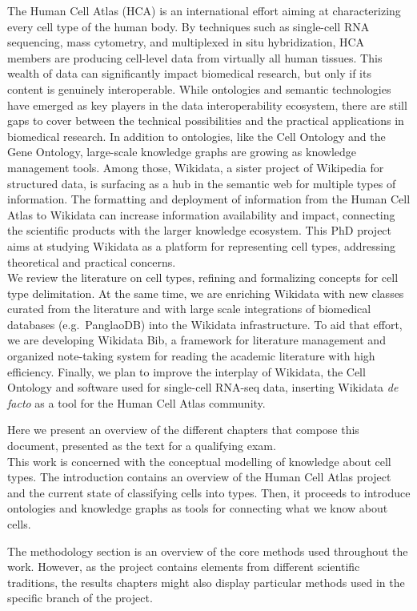 The Human Cell Atlas (HCA) is an international effort aiming at characterizing every cell type of the human body.
By techniques such as single-cell RNA sequencing, mass cytometry, and multiplexed in situ hybridization, HCA members are producing cell-level data from virtually all human tissues.
This wealth of data can significantly impact biomedical research, but only if its content is genuinely interoperable.
While ontologies and semantic technologies have emerged as key players in the data interoperability ecosystem, there are still gaps to cover between the technical possibilities and the practical applications in biomedical research.
In addition to ontologies, like the Cell Ontology and the Gene Ontology, large-scale knowledge graphs are growing as knowledge management tools.
Among those, Wikidata, a sister project of Wikipedia for structured data, is surfacing as a hub in the semantic web for multiple types of information.
The formatting and deployment of information from the Human Cell Atlas to Wikidata can increase information availability and impact, connecting the scientific products with the larger knowledge ecosystem.
This PhD project aims at studying Wikidata as a platform for representing cell types, addressing theoretical and practical concerns.\\
We review the literature on cell types, refining and formalizing concepts for cell type delimitation.
At the same time, we are enriching Wikidata with new classes curated from the literature and with large scale integrations of biomedical databases (e.g.~PanglaoDB) into the Wikidata infrastructure.
To aid that effort, we are developing Wikidata Bib, a framework for literature management and organized note-taking system for reading the academic literature with high efficiency.
Finally, we plan to improve the interplay of Wikidata, the Cell Ontology and software used for single-cell RNA-seq data, inserting Wikidata \emph{de facto} as a tool for the Human Cell Atlas community.

Here we present an overview of the different chapters that compose this document, presented as the text for a qualifying exam.\\
This work is concerned with the conceptual modelling of knowledge about cell types.
The introduction contains an overview of the Human Cell Atlas project and the current state of classifying cells into types.
Then, it proceeds to introduce ontologies and knowledge graphs as tools for connecting what we know about cells.

The methodology section is an overview of the core methods used throughout the work.
However, as the project contains elements from different scientific traditions, the results chapters might also display particular methods used in the specific branch of the project.

